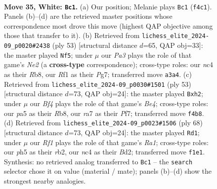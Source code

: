 \documentclass[11pt]{article}
\begin{document}
\clearpage

\begin{figure}[p]\centering
\begin{subfigure}{0.46\textwidth}\centering
\resizebox{\linewidth}{!}{%
\newchessgame
\chessboard[
  setfen={5r2/r7/p1B1bk2/p4ppp/2n2B2/P4PP1/1P5P/RK3RN1 w - - 0 35},
  showmover=false,
  pgfstyle=straightmove, color=movearrow, markmove={f4-c1}
]}
\caption{}
\end{subfigure}\hfill
\begin{subfigure}{0.46\textwidth}\centering
\resizebox{\linewidth}{!}{%
\newchessgame
\chessboard[
  setfen={1r1r1k2/4n1pp/B4p2/RP1pp3/4b2P/2P1NP2/6P1/5RK1 b - - 0 27},
  showmover=false,
  pgfstyle=straightmove, color=movearrow, markmove={e7-f5}
]}
\caption{}
\end{subfigure}
\\[4pt]
\begin{subfigure}{0.46\textwidth}\centering
\resizebox{\linewidth}{!}{%
\newchessgame
\chessboard[
  setfen={1r6/4rpk1/pp4pp/2pRb3/P3N3/2P5/1P3PPP/4RK2 b - - 5 27},
  showmover=false,
  pgfstyle=straightmove, color=movearrow, markmove={e5-h2}
]}
\caption{}
\end{subfigure}\hfill
\begin{subfigure}{0.46\textwidth}\centering
\resizebox{\linewidth}{!}{%
\newchessgame
\chessboard[
  setfen={4r3/5pk1/2p1bpp1/2Rn4/3P3p/2PB3P/1r1B1PP1/R4K2 w - - 3 35},
  showmover=false,
  pgfstyle=straightmove, color=movearrow, markmove={a1-d1}
]}
\caption{}
\end{subfigure}
\caption{\textbf{Move 35, White: \texttt{Bc1}.} (a) Our position; Melanie plays \texttt{Bc1} (\texttt{f4c1}). Panels (b)--(d) are the retrieved master positions whose correspondence most drove this move (highest QAP objective among those that transfer to it). (b) Retrieved from \texttt{lichess\_elite\_2024-09\_p0020\#2438} (ply 53) [structural distance $d$=65, QAP obj=33]: the master played \texttt{Nf5}; under $\mu$ our \emph{Pa3} plays the role of that game's \emph{Ne2} (a \textbf{cross-type} correspondence); cross-type roles: our \emph{n}c4 as their \emph{R}b8, our \emph{R}f1 as their \emph{P}g7; transferred move \texttt{a3a4}. (c) Retrieved from \texttt{lichess\_elite\_2024-09\_p0030\#1501} (ply 53) [structural distance $d$=73, QAP obj=24]: the master played \texttt{Bxh2}; under $\mu$ our \emph{Bf4} plays the role of that game's \emph{Be4}; cross-type roles: our \emph{p}a5 as their \emph{R}b8, our \emph{r}a7 as their \emph{P}f7; transferred move \texttt{f4b8}. (d) Retrieved from \texttt{lichess\_elite\_2024-09\_p0023\#1506} (ply 68) [structural distance $d$=73, QAP obj=24]: the master played \texttt{Rd1}; under $\mu$ our \emph{Rf1} plays the role of that game's \emph{Ra1}; cross-type roles: our \emph{p}h5 as their \emph{r}b2, our \emph{n}c4 as their \emph{B}d2; transferred move \texttt{f1e1}. Synthesis: no retrieved analog transferred to \texttt{Bc1} -- the \texttt{search} selector chose it on value (material / mate); panels (b)--(d) show the strongest nearby analogies.}
\label{fig:thought-m68}
\end{figure}
\end{document}
